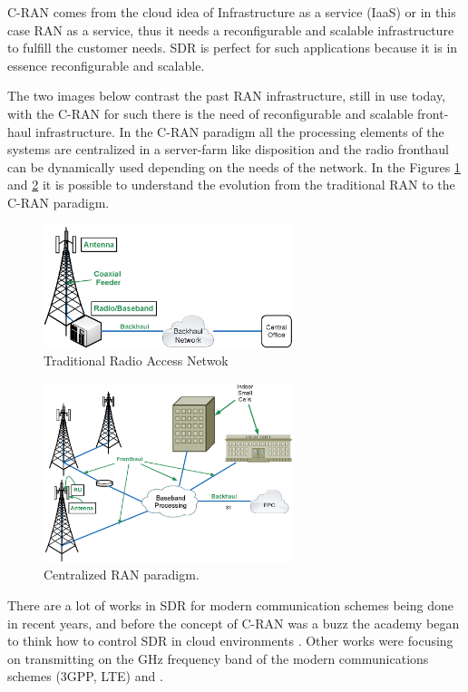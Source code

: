 C-RAN comes from the cloud idea of Infrastructure as a service (IaaS) or in this
case RAN as a service, thus it needs a reconfigurable and scalable
infrastructure to fulfill the customer needs. SDR is perfect for such
applications because  it is in essence reconfigurable and scalable.

The two images below contrast the past RAN infrastructure, still in use today,
with the C-RAN for such there is the need of reconfigurable and scalable
front-haul infrastructure. In the C-RAN paradigm all the processing elements of
the systems are centralized in a server-farm like disposition and the radio fronthaul
can be dynamically used depending on the needs of the network. In the Figures
\ref{fig:tran} and \ref{fig:cran} it is possible to understand the evolution
from the traditional RAN to the C-RAN paradigm.

\begin{figure}[htbp]
    \centering
    \includegraphics[width=0.65\textwidth]{./figures/traditional_bs}
    \caption{ Traditional Radio Access Netwok
    \label{fig:tran}}
\end{figure}

\begin{figure}[htbp]
    \centering
    \includegraphics[width=0.65\textwidth]{./figures/c_RAN}
    \caption{ Centralized RAN paradigm.
    \label{fig:cran}}
\end{figure}

There are a lot of works in SDR for modern communication schemes being done in
recent years, and before the concept of C-RAN was a buzz the academy began to
think how to control SDR in cloud environments \cite{dayananda2012}. Other
works were focusing on transmitting on the GHz frequency band of the modern
communications schemes (3GPP, LTE) \cite{kelley2009} and \cite{neenu2014}.

